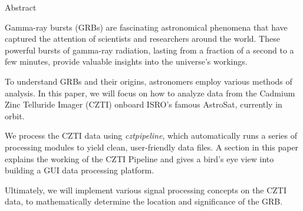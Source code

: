 \documentclass[11pt]{book} %
\begin{document}



\newpage
\pagestyle{empty}
\begin{center}
{\huge \textmd{Abstract}}\\
\par
\vspace{20pt}
Gamma-ray bursts (GRBs) are fascinating astronomical phenomena that have captured the attention of scientists and researchers around the world. These powerful bursts of gamma-ray radiation, lasting from a fraction of a second to a few minutes, provide valuable insights into the universe's workings.
\newline

To understand GRBs and their origins, astronomers employ various methods of analysis. In this paper, we will focus on how to analyze data from the Cadmium Zinc Telluride Imager (CZTI) onboard ISRO's famous AstroSat, currently in orbit.
\newline

We process the CZTI data using \textit{cztpipeline}, which automatically runs a series of processing modules to yield clean, user-friendly data files. A section in this paper explains the working of the CZTI Pipeline and gives a bird's eye view into building a GUI data processing platform.
\newline

Ultimately, we will implement various signal processing concepts on the CZTI data, to mathematically determine the location and significance of the GRB.

\end{center}
\vspace{5em}
\end{document}
